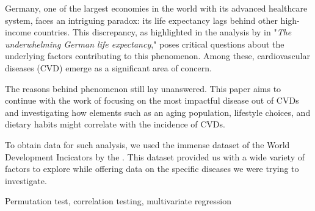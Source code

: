 Germany, one of the largest economies in the world with its advanced healthcare system, faces an intriguing paradox: its life expectancy lags behind other high-income countries. This discrepancy, as highlighted in the analysis by \citet{Jasilionis2023} in "\textit{The underwhelming German life expectancy}," poses critical questions about the underlying factors contributing to this phenomenon. Among these, cardiovascular diseases (CVD) emerge as a significant area of concern.

The reasons behind phenomenon still lay unanswered. This paper aims to continue with the work of \citet{Jasilionis2023} focusing on the most impactful disease out of CVDs and investigating how elements such as an aging population, lifestyle choices, and dietary habits might correlate with the incidence of CVDs.

To obtain data for such analysis, we used the immense dataset of the World Development Incicators by the \citet{worldbank_wdi}. This dataset provided us with a wide variety of factors to explore while offering data on the specific diseases we were trying to investigate.

Permutation test, correlation testing, multivariate regression